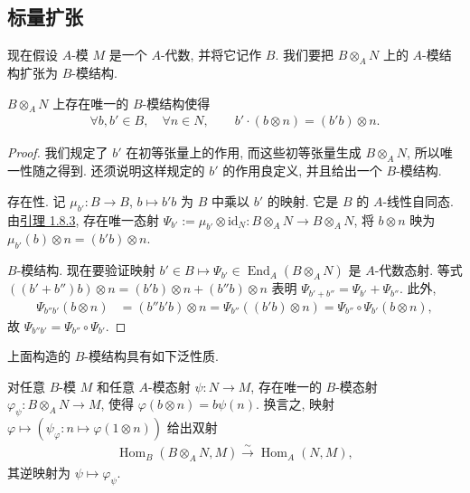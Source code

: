 \subsection{标量扩张}\label{sec:galois-1-8-6}
现在假设 $A$-模 $M$ 是一个 $A$-代数, 并将它记作 $B$. 我们要把 $B\otimes_A N$ 上的 $A$-模结构扩张为 $B$-模结构.
\begin{proposition*}
$B\otimes_A N$ 上存在唯一的 $B$-模结构使得
\begin{align*}
\forall b,b'\in B,\quad\forall n\in N,\qquad b'\cdot(b\otimes n)=(b'b)\otimes n.
\end{align*}
\end{proposition*}
\begin{proof}
我们规定了 $b'$ 在初等张量上的作用, 而这些初等张量生成 $B\otimes_A N$, 所以唯一性随之得到. 还须说明这样规定的 $b'$ 的作用良定义, 并且给出一个 $B$-模结构.

存在性. 记 $\mu_{b'}:B\longrightarrow B$, $b\mapsto b'b$ 为 $B$ 中乘以 $b'$ 的映射. 它是 $B$ 的 $A$-线性自同态. 由\hyperref[sec:galois-1-8-3]{引理 1.8.3}, 存在唯一态射 $\Psi_{b'}:=\mu_{b'}\otimes\mathrm{id}_N:B\otimes_A N\longrightarrow B\otimes_A N$, 将 $b\otimes n$ 映为 $\mu_{b'}(b)\otimes n=(b'b)\otimes n$.

$B$-模结构. 现在要验证映射 $b'\in B\mapsto\Psi_{b'}\in\operatorname{End}_A(B\otimes_A N)$ 是 $A$-代数态射. 等式 $((b'+b'')b)\otimes n=(b'b)\otimes n+(b''b)\otimes n$ 表明 $\Psi_{b'+b''}=\Psi_{b'}+\Psi_{b''}$. 此外,
\begin{align*}
\Psi_{b''b'}(b\otimes n)&=(b''b'b)\otimes n
=\Psi_{b''}((b'b)\otimes n)
=\Psi_{b''}\circ\Psi_{b'}(b\otimes n),
\end{align*}
故 $\Psi_{b''b'}=\Psi_{b''}\circ\Psi_{b'}$.
\end{proof}
上面构造的 $B$-模结构具有如下泛性质.
\begin{proposition*}
对任意 $B$-模 $M$ 和任意 $A$-模态射 $\psi:N\longrightarrow M$, 存在唯一的 $B$-模态射 $\varphi_\psi:B\otimes_A N\longrightarrow M$, 使得 $\varphi(b\otimes n)=b\psi(n)$. 换言之, 映射 $\varphi\mapsto(\psi_\varphi:n\mapsto\varphi(1\otimes n))$ 给出双射
\begin{align*}
\operatorname{Hom}_B(B\otimes_A N,M)\xrightarrow{\sim}\operatorname{Hom}_A(N,M),
\end{align*}
其逆映射为 $\psi\mapsto\varphi_\psi$.
\end{proposition*}
